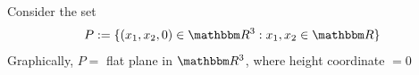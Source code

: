     



\begin{frame}
    
    \vspace{2em}
    \Eg 
    Consider the set 
    \begin{equation*}
        P := \setntn{(x_1, x_2, 0) \in \RR^3}{ x_1, x_2 \in \RR}
    \end{equation*}
    Graphically, $P =$ flat plane in $\RR^3$, where height
    coordinate $=0$
    \begin{figure}
       \begin{center}
       \end{center}
    \end{figure}

\end{frame}




